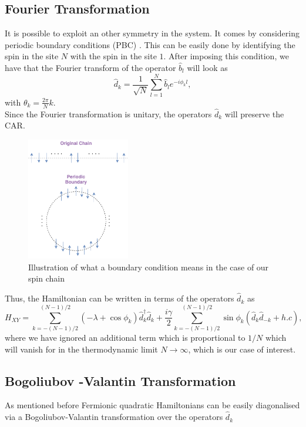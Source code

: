 \subsection{Fourier Transformation}
It is possible to exploit an other symmetry in the system. It comes by considering periodic boundary conditions (PBC)\cite{reyes-lega_aspects_2016} . This can be easily done by identifying the spin in the site $N$ with the spin in the site $1$. After imposing this condition, we have that the Fourier transform of the operator $\hat{b}_l$ will look as
\begin{equation}
\hat{d}_{k}=\frac{1}{\sqrt{N}} \sum_{l=1}^{N} \hat{b}_{l} e^{-i \phi_{k} l},
\end{equation}
with $\theta_{k}=\frac{2 \pi}{N} k$.\\
Since the Fourier transformation is unitary, the operators $\hat{d}_k$ will preserve the CAR.
\begin{figure}[H]
    \centering
    \includegraphics[width=0.4\textwidth]{Figures/Periodic_boundaries.png}
    \caption{Illustration of what a boundary condition means in the case of our spin chain}
    \label{periodic condition}
\end{figure}
Thus, the Hamiltonian can be written in terms of the operators $\hat{d}_k$ as
\begin{equation}
H_{X Y}=\sum_{k=-(N-1) / 2}^{(N-1) / 2}\left(-\lambda+\cos \phi_{k}\right) \hat{d}_{k}^{\dagger} \hat{d}_{k}+\frac{i \gamma}{2} \sum_{k=-(N-1) / 2}^{(N-1) / 2} \sin \phi_{k}\left(\hat{d}_{k} \hat{d}_{-k}+h . c\right),
\end{equation}
where we have ignored an additional term which is proportional to $1/N$ which will vanish for in the thermodynamic limit $N\to \infty$\cite{barouch_statistical_1970,barouch_statistical_1971}, which is our case of interest.
\subsection{Bogoliubov -Valantin Transformation}
As mentioned before Fermionic quadratic Hamiltonians can be easily diagonalised via a Bogoliubov-Valantin transformation over the operators $\hat{d}_k$

